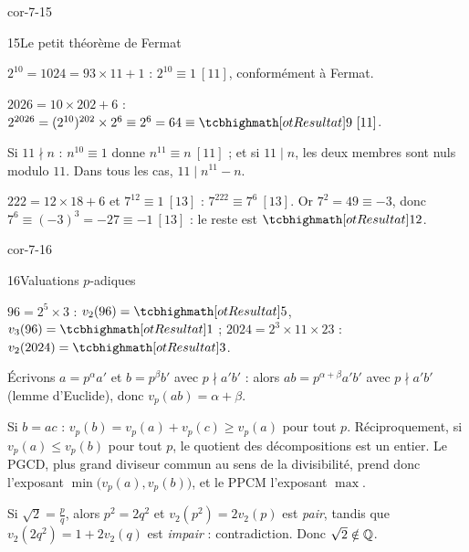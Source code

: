 \begin{blocLivre}{cor-7-15}
\begin{corrige}{15}{Le petit théorème de Fermat}
\begin{questions}
  \item $2^{10}=1024=93\times11+1$ : $2^{10}\equiv1\ [11]$, conformément à
    Fermat.
  \item $2026=10\times202+6$ :
    $2^{2026}=(2^{10})^{202}\times2^{6}\equiv2^{6}=64\equiv\res{9}\ [11]$.
  \item Si $11\nmid n$ : $n^{10}\equiv1$ donne $n^{11}\equiv n\ [11]$ ; et si
    $11\mid n$, les deux membres sont nuls modulo $11$. Dans tous les cas,
    $11\mid n^{11}-n$.
  \item $222=12\times18+6$ et $7^{12}\equiv1\ [13]$ :
    $7^{222}\equiv7^{6}\ [13]$. Or $7^{2}=49\equiv-3$, donc
    $7^{6}\equiv(-3)^{3}=-27\equiv-1\ [13]$ : le reste est $\res{12}$.
\end{questions}
\end{corrige}
\end{blocLivre}

\begin{blocLivre}{cor-7-16}
\begin{corrige}{16}{Valuations $p$-adiques}
\begin{questions}
  \item $96=2^{5}\times3$ : $v_2(96)=\res{5}$, $v_3(96)=\res{1}$ ;
    $2024=2^{3}\times11\times23$ : $v_2(2024)=\res{3}$.
  \item Écrivons $a=p^{\alpha}a'$ et $b=p^{\beta}b'$ avec $p\nmid a'b'$ :
    alors $ab=p^{\alpha+\beta}a'b'$ avec $p\nmid a'b'$ (lemme d'Euclide),
    donc $v_p(ab)=\alpha+\beta$.
  \item Si $b=ac$ : $v_p(b)=v_p(a)+v_p(c)\geq v_p(a)$ pour tout $p$.
    Réciproquement, si $v_p(a)\leq v_p(b)$ pour tout $p$, le quotient des
    décompositions est un entier. Le PGCD, plus grand diviseur commun au
    sens de la divisibilité, prend donc l'exposant
    $\min\bigl(v_p(a),v_p(b)\bigr)$, et le PPCM l'exposant $\max$.
  \item Si $\sqrt2=\frac pq$, alors $p^{2}=2q^{2}$ et
    $v_2(p^{2})=2v_2(p)$ est \emph{pair}, tandis que
    $v_2(2q^{2})=1+2v_2(q)$ est \emph{impair} : contradiction. Donc
    $\sqrt2\notin\mathbb{Q}$.
\end{questions}
\end{corrige}
\end{blocLivre}

